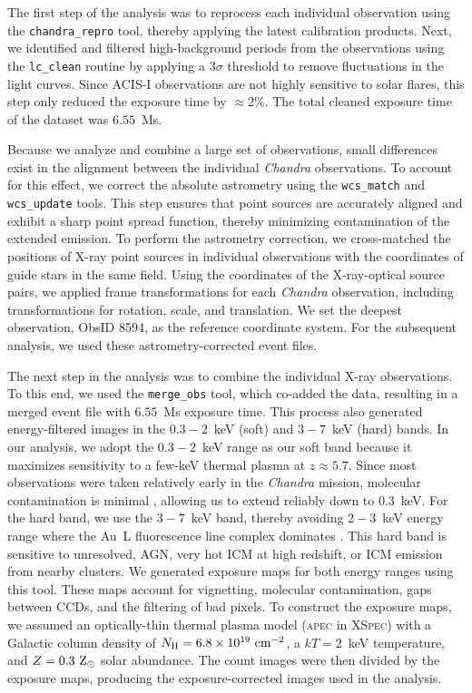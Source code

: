 \documentclass[pdflatex,sn-mathphys-num]{sn-jnl}
\theoremstyle{thmstyleone}
\theoremstyle{thmstyletwo}
\theoremstyle{thmstylethree}
\begin{document}
The first step of the analysis was to reprocess each individual observation using the \texttt{chandra\_repro} tool, thereby applying the latest calibration products. Next, we identified and filtered high-background periods from the observations using the \texttt{lc\_clean} routine by applying a $3\sigma$ threshold to remove fluctuations in the light curves. Since ACIS-I observations are not highly sensitive to solar flares, this step only reduced the exposure time by $\approx2\%$. The total cleaned exposure time of the dataset was $6.55$~Ms.

Because we analyze and combine a large set of observations, small differences exist in the alignment between the individual \textit{Chandra} observations. To account for this effect, we correct the absolute astrometry using the \texttt{wcs\_match} and \texttt{wcs\_update} tools. This step ensures that point sources are accurately aligned and exhibit a sharp point spread function, thereby  minimizing contamination of the extended emission. To perform the astrometry correction, we cross-matched the positions of X-ray point sources in individual observations with the coordinates of guide stars in the same field. Using the coordinates of the X-ray-optical source pairs, we applied frame transformations for each \textit{Chandra} observation, including transformations for rotation, scale, and translation. We set the deepest observation, ObsID 8594, as the reference coordinate system. For the subsequent analysis, we used these astrometry-corrected event files.

The next step in the analysis was to combine the individual X-ray observations. To this end, we used the \texttt{merge\_obs} tool, which co-added the data, resulting in a merged event file with $6.55$~Ms exposure time. This process also generated energy-filtered images in the $0.3-2$~keV (soft) and $3-7$~keV (hard) bands. In our analysis, we adopt the $0.3-2$~keV range as our soft band because it maximizes sensitivity to a few-keV thermal plasma at $z\approx5.7$. Since most observations were taken relatively early in the \textit{Chandra} mission, molecular contamination is minimal \cite{2018SPIE10699E..6BP,2022SPIE12181E..6XP}, allowing us to extend reliably down to 0.3~keV. For the hard band, we use the $3-7$~keV band, thereby avoiding $2-3$~keV energy range where the Au~L fluorescence line complex dominates \cite{2014A&A...566A..25B,2021A&A...655A.116S}. This hard band is sensitive to unresolved, AGN, very hot ICM at high redshift, or ICM emission from nearby clusters. We generated exposure maps for both energy ranges using this tool. These maps account for vignetting, molecular contamination, gaps between CCDs, and the filtering of bad pixels. To construct the exposure maps, we assumed an optically-thin thermal plasma model (\textsc{apec} in \textsc{XSpec}) with a Galactic column density of $N_{\rm H} = 6.8\times10^{19} \ \rm{cm^{-2}}$, a  $kT=2$~keV temperature, and $Z=0.3 \ \rm{Z_{\odot}}$ solar abundance. The count images were then divided by the exposure maps, producing the exposure-corrected images used in the analysis.
\end{document}
